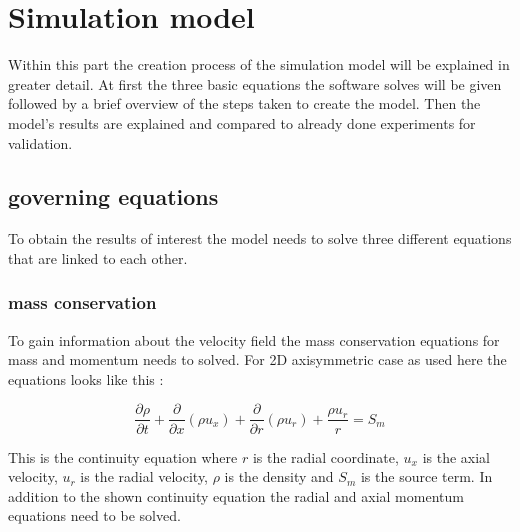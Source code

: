\documentclass[../thesis.tex]{subfiles}
\begin{document}
\chapter{Simulation model}
\label{chp:model}

Within this part the creation process of the simulation model will be explained in greater detail. At first the three basic equations the software solves will be given followed by a brief overview of the steps taken to create the model. Then the model's results are explained and compared to already done experiments for validation.

\section{governing equations}
\label{sec:gov_eqn}
To obtain the results of interest the model needs to solve three different equations that are linked to each other.

\subsection{mass conservation}
To gain information about the velocity field the mass conservation equations for mass and momentum needs to solved. For 2D axisymmetric case as used here the equations looks like this \cite{manual2009ansys}:

\begin{equation}
	\label{eqn:ansys_conti}
	\dfrac{\partial \rho}{\partial t} + \dfrac{\partial}{\partial x} (\rho u_x) + \dfrac{\partial }{\partial r} (\rho u_r)
	+ \dfrac{\rho u_r}{r} = S_m
\end{equation}

This is the continuity equation where $r$ is the radial coordinate, $u_x$ is the axial velocity, $u_r$ is the radial velocity, $\rho$ is the density and $S_m$ is the source term. In addition to the shown continuity equation the radial and axial momentum equations need to be solved.

\end{document}
